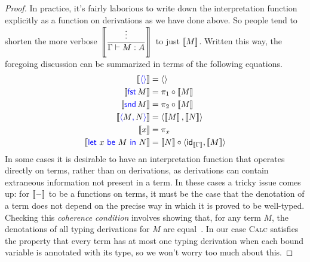 \begin{proof}
  In practice, it's fairly laborious to write down
  the interpretation function explicitly as a function
  on derivations as we have done above.
  So people tend to shorten the more verbose
  \(\left\llbracket \dfrac{\vdots}{\Gamma\vdash M : A}\right\rrbracket\)
  to just
  \(\left\llbracket M\right\rrbracket\). Written this way, the foregoing discussion
  can be summarized in terms of the following
  equations.
  \begin{align*}
    \llbr{\plunit} &= \angled{} \\
    \llbr{\plfst{M}} &= \pi_1 \circ \llbr{M} \\
    \llbr{\plsnd{M}} &= \pi_2 \circ \llbr{M} \\
    \llbr{\plpair{M}{N}} &= \angled{\llbr{M},\llbr{N}} \\
    \llbr{x} &= \pi_x \\
    \llbr{\pllet{x}{M}{N}} &=
      \llbr{N} \circ \angled{\idt_{\llbr{\Gamma}},\llbr{M}}
  \end{align*}
  In some cases it is desirable
  to have an interpretation function that operates
  directly on terms,
  rather than on derivations,
  as derivations can contain extraneous information
  not present in a term.
  In these cases a tricky issue comes up:
  for \(\left\llbracket -\right\rrbracket\) to be a functions on terms,
  it must be the case that
  the denotation of a term does not depend on
  the precise way in which it is proved to be well-typed.
  Checking this \emph{coherence condition}
  involves showing that, for any term \(M\),
  the denotations of all typing derivations
  for \(M\) are equal~\citep{reynolds1991coherence}.
  In our case \textsc{Calc} satisfies the property that every term has at most one typing derivation
  when each bound variable is annotated with its type,
  so we won't worry too much about this.


\end{proof}
